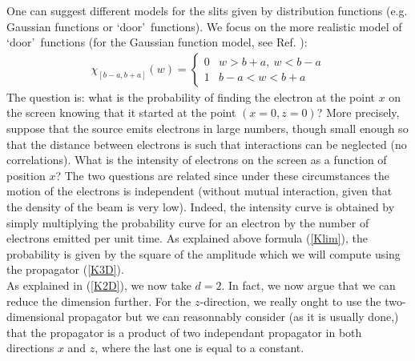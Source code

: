 \documentclass[12pt,aps,prb,preprint]{revtex4-1}   %
\begin{document}
One can suggest different models for the slits given by
distribution functions (e.g. Gaussian functions or \lq door\rq\
functions). We focus on the more realistic model of \lq door\rq\
functions (for the Gaussian function model, see Ref. \cite{FH}):
\begin{eqnarray}\label{Porte}
\chi_{[b-a,b+a]}(w)=\begin{cases}
0 & \text{$w > b+a,\ w < b-a$} \\
1 & \text{$b-a<w<b+a$}
\end{cases}
\end{eqnarray}
The question is: what is the probability of finding the electron
at the point $ x $ on the screen knowing that it started at the
point $ (x = 0, z = 0) $? More precisely, suppose that the
source emits electrons in large numbers, though small enough so
that the distance between electrons is such that interactions
can be neglected (no correlations). What is the intensity of
electrons on the screen as a function of position $x$? The two
questions are related since under these circumstances the motion
of the electrons is independent (without mutual interaction,
given that the density of the beam is very low). Indeed, the
intensity curve is obtained by simply multiplying the
probability curve for an electron by the number of electrons
emitted per unit time.
{As explained above formula (\ref{Klim}),
the probability is given by the square of the amplitude which 
we will compute using the propagator (\ref{K3D}).}\\

As explained in (\ref{K2D}), we now take $d=2$.
In fact, we now argue that we can reduce the dimension further. 
For the $z$-direction, we really onght to use the two-dimensional propagator
but we can reasonnably consider (as it is usually done\cite{Frabboni},\cite{FH}) 
that the propagator is a product of two independant propagator
in both directions $x$ and $z$, where the last one is equal to a constant.
\end{document}
